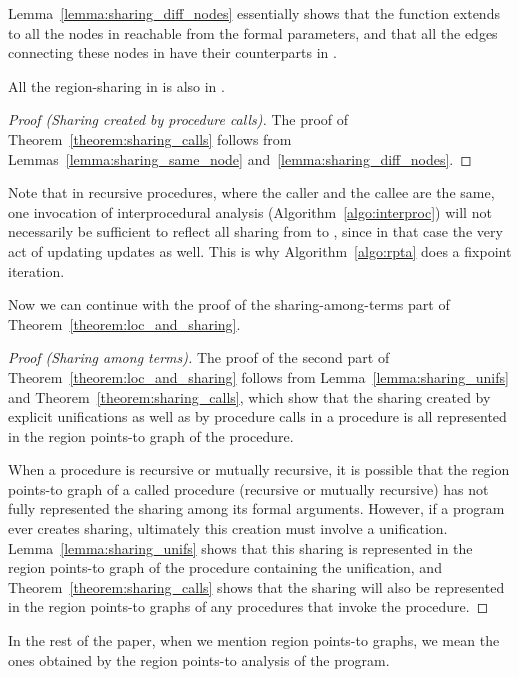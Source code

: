 \documentclass{tlp}
\begin{document}
Lemma~\ref{lemma:sharing_diff_nodes} essentially shows that
the  function extends to all the nodes in 
reachable from the formal parameters,
and that all the edges connecting these nodes in 
have their counterparts in .

\begin{theorem}
\label{theorem:sharing_calls}
All the region-sharing in  is also in .
\end{theorem}
\begin{proof}[Proof (Sharing created by procedure calls)]
The proof of Theorem~\ref{theorem:sharing_calls} follows from
Lemmas~\ref{lemma:sharing_same_node} and~\ref{lemma:sharing_diff_nodes}.
\end{proof}

Note that
in recursive procedures, where the caller and the callee are the same,
one invocation of interprocedural analysis (Algorithm~\ref{algo:interproc})
will not necessarily be sufficient to reflect all sharing
from  to ,
since in that case the very act of updating 
updates  as well.
This is why Algorithm~\ref{algo:rpta} does a fixpoint iteration.

Now we can continue with the proof of the sharing-among-terms part of
Theorem~\ref{theorem:loc_and_sharing}.
\begin{proof}[Proof (Sharing among terms)]
The proof of the second part of
Theorem~\ref{theorem:loc_and_sharing}
follows from Lemma~\ref{lemma:sharing_unifs} and
Theorem~\ref{theorem:sharing_calls},
which show that the sharing created by explicit unifications
as well as by procedure calls in a procedure is all represented in
the region points-to graph of the procedure.

When a procedure is recursive or mutually recursive,
it is possible that the region points-to graph of a called procedure
(recursive or mutually recursive) has not fully represented the sharing
among its formal arguments.
However, if a program ever creates sharing,
ultimately this creation must involve a unification.
Lemma~\ref{lemma:sharing_unifs} shows that
this sharing is represented in the region points-to graph of
the procedure containing the unification,
and Theorem~\ref{theorem:sharing_calls} shows that
the sharing will also be represented in
the region points-to graphs of any procedures that invoke the procedure.
\end{proof}

In the rest of the paper,
when we mention region points-to graphs,
we mean the ones obtained by the region points-to analysis of the program.
\end{document}
